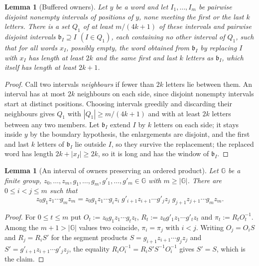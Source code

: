 \documentclass[11pt]{article}
\numberwithin{equation}{section}
\theoremstyle{plain}
\newtheorem{lemma}[theorem]{Lemma}
\theoremstyle{definition}
\theoremstyle{remark}
\theoremstyle{plain}
\begin{document}
\begin{lemma}[Buffered owners]
\label{lem:buffered}
Let $y$ be a word and let $I_1,\ldots,I_m$ be pairwise disjoint nonempty
intervals of positions of $y$, none meeting the first or the last $k$ letters.
There is a set $Q_1$ of at least $m/(4k+1)$ of these intervals and pairwise
disjoint intervals $\mathfrak b_I\supseteq I$ $(I\in Q_1)$, each containing no other
interval of $Q_1$, such that for all words $x_I$, possibly empty, the word obtained from
$\mathfrak b_I$ by replacing $I$ with $x_I$ has length at least $2k$ and the same
first and last $k$ letters as $\mathfrak b_I$, which itself has length at least
$2k+1$.
\end{lemma}

\begin{proof}
Call two intervals \emph{neighbours} if fewer than $2k$ letters lie between them.
An interval has at most $2k$ neighbours on each side, since disjoint nonempty
intervals start at distinct positions.  Choosing intervals greedily and
discarding their neighbours gives $Q_1$ with $|Q_1|\ge m/(4k+1)$ and with at
least $2k$ letters between any two members.  Let $\mathfrak b_I$ extend $I$ by $k$
letters on each side; it stays inside $y$ by the boundary hypothesis, the
enlargements are disjoint, and the first and last $k$ letters of $\mathfrak b_I$ lie
outside $I$, so they survive the replacement; the replaced word has length
$2k+|x_I|\ge2k$, so it is long and has the window of $\mathfrak b_I$.
\end{proof}

\begin{lemma}[An interval of owners preserving an ordered product]
\label{lem:group-interval}
Let $\mathbb G$ be a finite group, $z_0,\ldots,z_m,g_1,\ldots,g_m,g'_1,\ldots,g'_m\in\mathbb G$
with $m\ge|\mathbb G|$.  There are $0\le i<j\le m$ such that
\[
 z_0g_1z_1\cdots g_mz_m=
 z_0g_1z_1\cdots g_iz_i\;g'_{i+1}z_{i+1}\cdots g'_jz_j\;g_{j+1}z_{j+1}\cdots g_mz_m .
\]
\end{lemma}

\begin{proof}
For $0\le t\le m$ put $O_t:=z_0g_1z_1\cdots g_tz_t$, $R_t:=z_0g'_1z_1\cdots g'_tz_t$ and
$\pi_t:=R_tO_t^{-1}$.  Among the $m+1>|\mathbb G|$ values two coincide,
$\pi_i=\pi_j$ with $i<j$.  Writing $O_j=O_iS$ and $R_j=R_iS'$ for the segment
products $S=g_{i+1}z_{i+1}\cdots g_jz_j$ and $S'=g'_{i+1}z_{i+1}\cdots g'_jz_j$, the
equality $R_iO_i^{-1}=R_iS'S^{-1}O_i^{-1}$ gives $S'=S$, which is the claim.
\end{proof}
\end{document}
